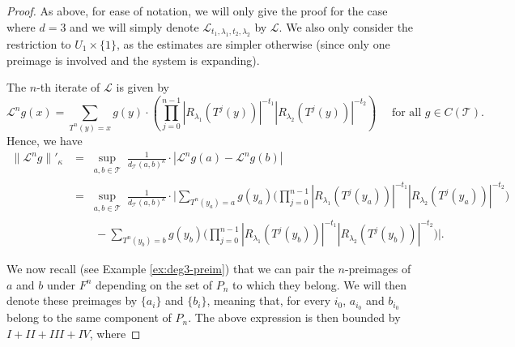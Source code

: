 \documentclass[10pt,a4paper]{amsart}
\begin{document}
\begin{proof}
As above, for ease of notation, we will only give the proof for the case where $d=3$ and we will simply
denote $\mathcal L_{t_1, \lambda_1, t_2, \lambda_2}$
by $\mathcal L$.
We also only consider the restriction to $U_1 \times \{1\}$, as the estimates are simpler otherwise (since only one preimage is involved and the system is expanding).

\medskip

The $n$-th iterate of $\mathcal L$ is given by
\[
\mathcal{L}
^n g(x) = \sum_{T^n(y) = x} g(y) \cdot
\left(
\prod_{j=0}^{n-1}
|R_{\lambda_1}(T^{j}(y))|^{-t_1}
|R_{\lambda_2}(T^{j}(y))|^{-t_2}
\right)
\quad \mbox{ for all }
g \in C(\mathcal T).
\]
Hence, 
we have
\[
\begin{aligned}
\|\mathcal L^n
g\|'_{\kappa} &=
\sup_{\substack{a,b\in \mathcal T}}
\frac{1}{d_{\mathcal{T}}(a,b)^{\kappa}} \cdot|\mathcal L^n
g(a)-
\mathcal L^n
g(b)|\\
& =\sup_{\substack{a,b\in \mathcal T}}
\frac{1}{d_{\mathcal{T}}(a,b)^{\kappa}} \cdot
\Big|\sum_{T^n(y_a) = a}  g(y_a)
\Big(
\prod_{j=0}^{n-1}
|R_{\lambda_1}(T^{j}(y_a))|^{-t_1}
|R_{\lambda_2}(T^{j}(y_a))|^{-t_2}
\Big)
\\
& \quad  \quad -\sum_{T^n(y_b) = b} g(y_b)
\Big(
\prod_{j=0}^{n-1}
|R_{\lambda_1}(T^{j}(y_b))|^{-t_1}
|R_{\lambda_2}(T^{j}(y_b))|^{-t_2}
\Big)
\Big|.
\end{aligned}\]


We now recall (see Example \ref{ex:deg3-preim}) that we can pair the $n$-preimages of $a$ and $b$ under $F^n$
depending on the set of $P_n$ to which they belong. We will then denote these preimages by $\{a_i\}$ and $\{b_i\}$,
meaning that, for every $i_0$, $a_{i_0}$
and $b_{i_0}$ belong to the same component of $P_n$. The above expression is then bounded by $I+ II+III+IV$, where




\end{proof}
\end{document}
